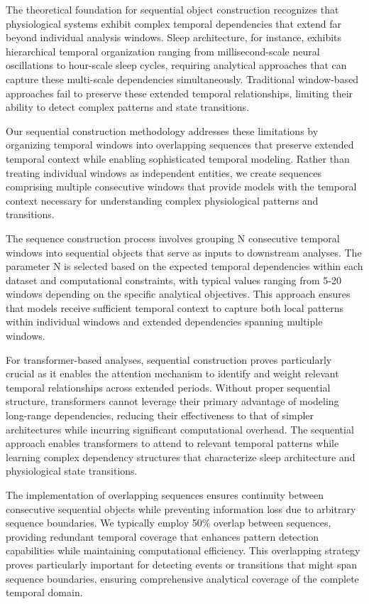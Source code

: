 \documentclass[a4paper,12pt,twoside]{article}
\begin{document}
The theoretical foundation for sequential object construction recognizes that physiological systems exhibit complex temporal dependencies that extend far beyond individual analysis windows. Sleep architecture, for instance, exhibits hierarchical temporal organization ranging from millisecond-scale neural oscillations to hour-scale sleep cycles, requiring analytical approaches that can capture these multi-scale dependencies simultaneously. Traditional window-based approaches fail to preserve these extended temporal relationships, limiting their ability to detect complex patterns and state transitions.

Our sequential construction methodology addresses these limitations by organizing temporal windows into overlapping sequences that preserve extended temporal context while enabling sophisticated temporal modeling. Rather than treating individual windows as independent entities, we create sequences comprising multiple consecutive windows that provide models with the temporal context necessary for understanding complex physiological patterns and transitions.

The sequence construction process involves grouping N consecutive temporal windows into sequential objects that serve as inputs to downstream analyses. The parameter N is selected based on the expected temporal dependencies within each dataset and computational constraints, with typical values ranging from 5-20 windows depending on the specific analytical objectives. This approach ensures that models receive sufficient temporal context to capture both local patterns within individual windows and extended dependencies spanning multiple windows.

For transformer-based analyses, sequential construction proves particularly crucial as it enables the attention mechanism to identify and weight relevant temporal relationships across extended periods. Without proper sequential structure, transformers cannot leverage their primary advantage of modeling long-range dependencies, reducing their effectiveness to that of simpler architectures while incurring significant computational overhead. The sequential approach enables transformers to attend to relevant temporal patterns while learning complex dependency structures that characterize sleep architecture and physiological state transitions.

The implementation of overlapping sequences ensures continuity between consecutive sequential objects while preventing information loss due to arbitrary sequence boundaries. We typically employ 50\% overlap between sequences, providing redundant temporal coverage that enhances pattern detection capabilities while maintaining computational efficiency. This overlapping strategy proves particularly important for detecting events or transitions that might span sequence boundaries, ensuring comprehensive analytical coverage of the complete temporal domain.
\end{document}
